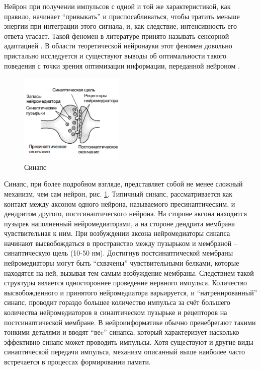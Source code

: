 \documentclass[a4paper,10pt]{article}
\begin{document}
\indent Нейрон при получении импульсов с одной и той же характеристикой, как правило, начинает ``привыкать'' и приспосабливаться, чтобы тратить меньше энергии при интеграции этого сигнала, и, как следствие, интенсивность его ответа угасает. Такой феномен в литературе принято называть сенсорной адаптацией \cite{Phizi}. В области теоретической нейронауки этот феномен довольно пристально исследуется и существуют выводы об оптимальности такого поведения с точки зрения оптимизации информации, переданной нейроном \cite{Adapt,TripleAdapt}.\\
\begin{figure}[ht]
\centering
\captionsetup{justification=centering,margin=1cm}
\includegraphics[width=50mm,scale=0.7]{synapse.png}
\caption{Синапс}
\label{syn_pic}
\end{figure}
\FloatBarrier
\indent Синапс, при более подробном взгляде, представляет собой не менее сложный механизм, чем сам нейрон, рис. \ref{syn_pic}. Типичный синапс, рассматривается как контакт между аксоном одного нейрона, называемого пресинаптическим, и дендритом другого, постсинаптического нейрона. На стороне аксона находится пузырек наполненный нейромедиаторами, а на стороне дендрита мембрана чувствительная к ним. При возбуждении аксона нейромедиаторы синапса начинают высвобождаться в пространство между пузырьком и мембраной -- синаптическую щель (10-50 нм). Достигнув постсинаптической мембраны нейромедиаторы могут быть ``схвачены'' чувствительными белками, которые находятся на ней, вызывая тем самым возбуждение мембраны. Следствием такой структуры является одностороннее проведение нервного импульса. Количество высвобожденного и принятого нейромедиатора варьируется, и ``натренированный'' синапс, проводит гораздо большее количество импульса за счёт большего количества нейромедиаторов в синаптическом пузырьке и рецепторов на постсинаптической мембране. В нейроинформатике обычно пренебрегают такими тонкими деталями и вводят ``веc'' синапса, который характеризует насколько эффективно синапс может проводить импульсы. Хотя существуют и другие виды синаптической передачи импульса, механизм описанный выше наиболее часто встречается в процессах формировании памяти.\\
\end{document}
